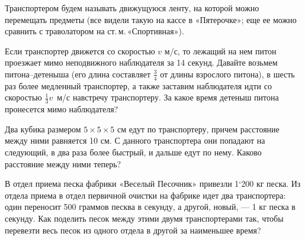 ﻿
\noindent Транспортером будем называть движущуюся ленту, на которой можно перемещать предметы (все видели такую на кассе в «Пятерочке»; еще ее можно сравнить с траволатором на ст.\,м.\,«Спортивная»).

\begin{enumerate}
\itA Если транспортер движется со скоростью $v$ м/с, то лежащий на нем питон проезжает мимо неподвижного наблюдателя за 14 секунд. Давайте возьмем питона–детеныша (его длина составляет $\tfrac{3}{4}$ от длины взрослого питона), в шесть раз более медленный транспортер, а также заставим наблюдателя идти со скоростью $\tfrac{1}{3}v$~м/с навстречу транспортеру. За какое время детеныш питона пронесется мимо наблюдателя?

\itB Два кубика размером $5 \times 5 \times 5$ см едут по транспортеру, причем расстояние между ними равняется 10 см. С данного транспортера они попадают на следующий, в два раза более быстрый, и дальше едут по нему. Каково расстояние между ними теперь?

\itC В отдел приема песка фабрики «Веселый Песочник» привезли 1`200 кг песка. Из отдела приема в отдел первичной очистки на фабрике идет два транспортера: один переносит 500 граммов песква в секунду, а другой, новый, — 1 кг песка в секунду. Как поделить песок между этими двумя транспортерами так, чтобы перевезти весь песок из одного отдела в другой за наименьшее время?
\end{enumerate}